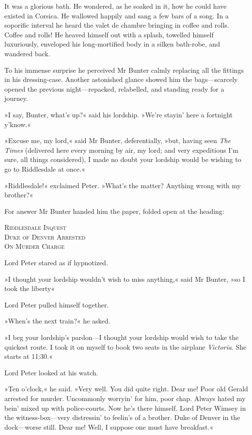 It was a glorious bath. He wondered, as he soaked in it, how he could have existed in Corsica. He wallowed happily and sang a few bars of a song. In a soporific interval he heard the valet de chambre bringing in coffee and rolls. Coffee and rolls! He heaved himself out with a splash, towelled himself luxuriously, enveloped his long-mortified body in a silken bath-robe, and wandered back.

To his immense surprise he perceived Mr Bunter calmly replacing all the fittings in his dressing-case. Another astonished glance showed him the bags\allowbreak---\allowbreak scarcely opened the previous night\allowbreak---\allowbreak repacked, relabelled, and standing ready for a journey.

»I say, Bunter, what's up?« said his lordship. »We're stayin' here a fortnight y'know.«

»Excuse me, my lord,« said Mr Bunter, deferentially, »but, having seen \textit{The Times} (delivered here every morning by air, my lord; and very expeditious I'm sure, all things considered), I made no doubt your lordship would be wishing to go to Riddlesdale at once.«

»Riddlesdale!« exclaimed Peter. »What's the matter? Anything wrong with my brother?«

For answer Mr Bunter handed him the paper, folded open at the heading:
\begin{center}
\textsc{Riddlesdale Inquest\\
Duke of Denver Arrested\\
On Murder Charge}
\end{center}


Lord Peter stared as if hypnotized.

»I thought your lordship wouldn't wish to miss anything,« said Mr  Bunter, »so I took the liberty\longdash«

Lord Peter pulled himself together.

»When's the next train?« he asked.

»I beg your lordship's pardon\allowbreak---\allowbreak I thought your lordship would wish to take the quickest route. I took it on myself to book two seats in the airplane \textit{Victoria}. She starts at 11:30.«

Lord Peter looked at his watch.

»Ten o'clock,« he said. »Very well. You did quite right. Dear me! Poor old Gerald arrested for murder. Uncommonly worryin' for him, poor chap.  Always hated my bein' mixed up with police-courts. Now he's there himself. Lord Peter Wimsey in the witness-box\allowbreak---\allowbreak very distressin' to feelin's of a brother. Duke of Denver in the dock\allowbreak---\allowbreak worse still. Dear me! Well, I suppose one must have breakfast.«

